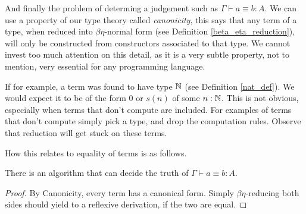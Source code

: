 And finally the problem of determing a judgement such as $\Gamma \vdash a \equiv b : A$. We can use a property of our type theory called \emph{canonicity}, this says that any term of a type, when reduced into $\beta \eta$-normal form (see Definition \ref{beta_eta_reduction}), will only be constructed from constructors associated to that type. We cannot invest too much attention on this detail, as it is a very subtle property, not to mention, very essential for any programming language.

If for example, a term was found to have type $\mathbb{N}$ (see Definition \ref{nat_def}). We would expect it to be of the form $0$ or $s(n)$ of some $n : \mathbb{N}$. This is not obvious, especially when terms that don't compute are included. For examples of terms that don't compute simply pick a type, and drop the computation rules. Observe that reduction will get stuck on these terms.

How this relates to equality of terms is as follows.

\begin{theorem}
    There is an algorithm that can decide the truth of $\Gamma \vdash a \equiv b : A$.
\end{theorem}

\begin{proof}
    By Canonicity, every term has a canonical form. Simply $\beta \eta$-reducing both sides should yield to a reflexive derivation, if the two are equal.
\end{proof}








